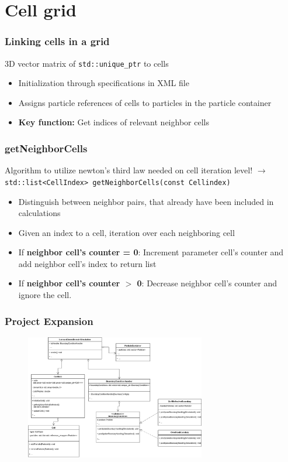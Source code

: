 
\section{Cell grid}
\label{sec:grid}

\begin{frame}
    \frametitle{Linking cells in a grid}
    3D vector matrix of \texttt{std::unique\_ptr} to cells
    \begin{itemize}
        \item Initialization through specifications in XML file
        \item Assigns particle references of cells to particles in the particle container
        \item \textbf{Key function:} Get indices of relevant neighbor cells
    \end{itemize}
\end{frame}

\begin{frame}
    \frametitle{getNeighborCells}
    Algorithm to utilize newton's third law needed on cell iteration level!\newline
    $\longrightarrow$ \texttt{std::list<CellIndex> getNeighborCells(const Cellindex)}
    \begin{itemize}
        \item Distinguish between neighbor pairs, that already have been included in calculations
        \item Given an index to a cell, iteration over each neighboring cell
        \item If \textbf{neighbor cell's counter = 0}: Increment parameter cell's counter and add neighbor cell's index to return list
        \item If \textbf{neighbor cell's counter $>$ 0}: Decrease neighbor cell's counter and ignore the cell.
    \end{itemize}
\end{frame}

\begin{frame}
    \frametitle{Project Expansion}
    \begin{figure}
        \label{fig:umlcellgrid}
        \includegraphics[width=0.7\textwidth]{res/UML3.drawio}
    \end{figure}
\end{frame}